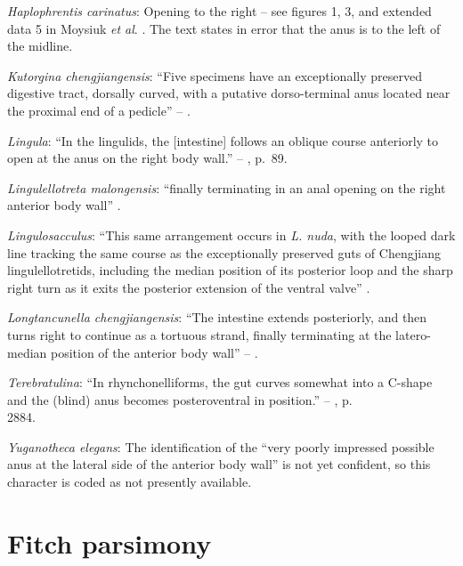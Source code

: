 \documentclass[openany]{book}
\theoremstyle{definition}
\theoremstyle{definition}
\theoremstyle{definition}
\theoremstyle{remark}
\begin{document}
\hypertarget{Haplophrentis_carinatus-coding-107}{}
\emph{Haplophrentis carinatus}: Opening to the right -- see figures 1,
3, and extended data 5 in Moysiuk \emph{et al}.
\citeyearpar{Moysiuk2017Hyolithsare}. The text states in error that the
anus is to the left of the midline.

\hypertarget{Kutorgina_chengjiangensis-coding-107}{}
\emph{Kutorgina chengjiangensis}: ``Five specimens have an exceptionally
preserved digestive tract, dorsally curved, with a putative
dorso-terminal anus located near the proximal end of a pedicle'' --
\citet{Zhang2007Rhynchonelliformeanbrachiopods}.

\hypertarget{Lingula-coding-107}{}
\emph{Lingula}: ``In the lingulids, the {[}intestine{]} follows an
oblique course anteriorly to open at the anus on the right body wall.''
-- \citet{Williams1997Introduction}, p.~89.

\hypertarget{Lingulellotreta_malongensis-coding-107}{}
\emph{Lingulellotreta malongensis}: ``finally terminating in an anal
opening on the right anterior body wall'' \citep[p.66]{Zhang2007Noteon}.

\hypertarget{Lingulosacculus-coding-107}{}
\emph{Lingulosacculus}: ``This same arrangement occurs in \emph{L.
nuda}, with the looped dark line tracking the same course as the
exceptionally preserved guts of Chengjiang lingulellotretids, including
the median position of its posterior loop and the sharp right turn as it
exits the posterior extension of the ventral valve''
\citep[p.310]{Balthasar2009EarlyCambrian}.

\hypertarget{Longtancunella_chengjiangensis-coding-107}{}
\emph{Longtancunella chengjiangensis}: ``The intestine extends
posteriorly, and then turns right to continue as a tortuous strand,
finally terminating at the latero-median position of the anterior body
wall'' -- \citet{Zhang2007Agregarious}.

\hypertarget{Terebratulina-coding-107}{}
\emph{Terebratulina}: ``In rhynchonelliforms, the gut curves somewhat
into a C-shape and the (blind) anus becomes posteroventral in
position.'' -- \citet{Williams2007Supplement}, p.\\
2884.

\hypertarget{Yuganotheca_elegans-coding-107}{}
\emph{Yuganotheca elegans}: The identification of the ``very poorly
impressed possible anus at the lateral side of the anterior body wall''
is not yet confident, so this character is coded as not presently
available.

\hypertarget{fitch}{\chapter{Fitch parsimony}\label{fitch}}
\end{document}

